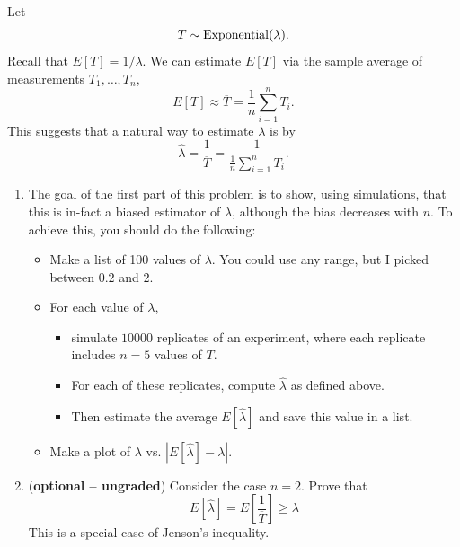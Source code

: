 \begin{exercise}
Let
\begin{equation*}
T \sim {\rm Exponential}(\lambda). 
\end{equation*}
Recall that $E[T] = 1/\lambda$. We can estimate $E[T]$ via the sample average of measurements $T_1,\dots,T_n$, 
\begin{equation*}
E[T] \approx \overline{T} = \frac{1}{n}\sum_{i=1}^nT_i.
\end{equation*}
This suggests that a natural way to estimate $\lambda$ is by 
\begin{equation*}
\hat{\lambda} = \frac{1}{\overline{T}} = \frac{1}{ \frac{1}{n}\sum_{i=1}^nT_i}. 
\end{equation*}
\begin{enumerate}[label=(\alph*)]
\item  The goal of the first part of this problem is to show, using simulations, that this is in-fact a biased estimator of $\lambda$, although the bias decreases with $n$. 
To achieve this, you should do the following: 
\begin{itemize}
\item Make a list of 100 values of $\lambda$. You could use any range, but I picked between $0.2$ and $2$. 
\item For each value of $\lambda$, 
\begin{itemize}
\item simulate $10000$ replicates of an experiment, where each replicate includes $n=5$ values of $T$. 
\item For each of these replicates, compute $\hat{\lambda}$ as defined above. 
\item Then estimate the average $E[\hat{\lambda}]$ and save this value in a list. 
\end{itemize}
\item Make a plot of $\lambda$ vs. $\left|E[\hat{\lambda}]-\lambda\right|$. 
\end{itemize}
\item ({\bf optional -- ungraded}) Consider the case $n=2$. Prove that 
\begin{equation*}
E[\hat{\lambda}] = E\left[\frac{1}{\overline{T}}\right]  \ge \lambda 
\end{equation*}
This is a special case of Jenson's inequality. 
\end{enumerate}



\end{exercise}
